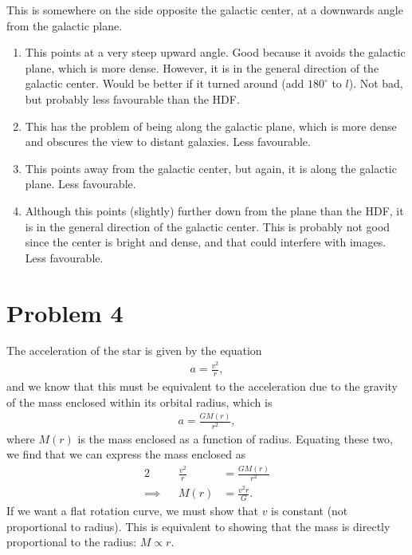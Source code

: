 \documentclass[11pt,letterpaper]{article}
\begin{document}
This is somewhere on the side opposite the galactic center, at a downwards angle from the galactic plane. 

\begin{enumerate}[label=(\arabic*)]
    \item This points at a very steep upward angle. Good because it avoids the galactic plane, which is more dense. However, it is in the general direction of the galactic center. Would be better if it turned around (add $180^\circ$ to $l$). Not bad, but probably less favourable than the HDF. 
    \item This has the problem of being along the galactic plane, which is more dense and obscures the view to distant galaxies. Less favourable.
    \item This points away from the galactic center, but again, it is along the galactic plane. Less favourable. 
    \item Although this points (slightly) further down from the plane than the HDF, it is in the general direction of the galactic center. This is probably not good since the center is bright and dense, and that could interfere with images. Less favourable.
\end{enumerate}


\section*{Problem 4} 

The acceleration of the star is given by the equation 
        \begin{align*}
            a = \frac{v^2}{r},
        \end{align*}
        and we know that this must be equivalent to the acceleration due to the gravity of the mass enclosed within its orbital radius, which is 
        \begin{align*}
            a = \frac{GM(r)}{r^2},
        \end{align*}
        where $M(r)$ is the mass enclosed as a function of radius.
        Equating these two, we find that we can express the mass enclosed as 
        \begin{alignat*}{2}
            &&\frac{v^2}{r} &= \frac{GM(r)}{r^2} \\
            \implies&&M(r) &= \frac{v^2r}{G}.
        \end{alignat*}
        If we want a flat rotation curve, we must show that $v$ is constant (not proportional to radius). This is equivalent to showing that the mass is directly proportional to the radius: $M \propto r$. 
\end{document}
